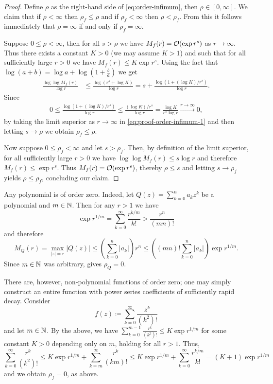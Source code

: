\begin{proof}
    Define $\rho$ as the right-hand side of \eqref{eq:order-infimum}, then $\rho \in [0, \infty]$. We claim that if $\rho < \infty$ then $\rho_f \leq \rho$ and if $\rho_f < \infty$ then $\rho < \rho_f$. From this it follows immediately that $\rho = \infty$ if and only if $\rho_f = \infty$.

    Suppose $0 \leq \rho < \infty$, then for all $s > \rho$ we have $M_f(r) = \mathcal{O}(\exp r^s)$ as $r \to \infty$. Thus there exists a constant $K > 0$ (we may assume $K > 1$) and such that for all sufficiently large $r > 0$ we have $M_f(r) \leq K \exp r^s$. Using the fact that $\log (a+b) = \log a + \log (1 + \frac{b}{a})$ we get
    \begin{align*}
        \frac{\log \log M_f(r)}{\log r} &\leq \frac{\log (r^s + \log K)}{\log r} = s + \frac{\log (1 + (\log K) / r^s)}{\log r}. \tag{\textasteriskcentered} \label{eq:proof-order-infimum-1}
    \end{align*}
    Since
    \begin{align*}
        0 \leq \frac{\log (1 + (\log K) / r^s)}{\log r} \leq \frac{(\log K) / r^s}{\log r} = \frac{\log K}{r^s \log r} \xrightarrow{r \to \infty} 0,
    \end{align*}
    by taking the limit superior as $r \to \infty$ in \eqref{eq:proof-order-infimum-1} and then letting $s \to \rho$ we obtain $\rho_f \leq \rho$.

    Now suppose $0 \leq \rho_f < \infty$ and let $s > \rho_f$. Then, by definition of the limit superior, for all sufficiently large $r > 0$ we have $ \log \log M_f(r) \leq s \log r$ and therefore $M_f(r) \leq \exp r^s$. Thus $M_f(r) = \mathcal{O}(\exp r^s)$, thereby $\rho \leq s$ and letting $s \to \rho_f$ yields $\rho \leq \rho_f$, concluding our claim.
\end{proof}

\begin{remark} \label{rem:order-zero}
    Any polynomial is of order zero. Indeed, let $Q(z) = \sum_{k=0}^n a_k z^k$ be a polynomial and $m \in \mathbb{N}$. Then for any $r > 1$ we have
    $$ \exp r^{1/m} = \sum_{k=0}^\infty \frac{r^{k/m}}{k!} > \frac{r^{n}}{(mn)!} $$
    and therefore
    $$ M_Q(r) = \max_{\vert z \vert = r} \vert Q(z) \vert \leq \left( \sum_{k=0}^n \vert a_k \vert \right) r^n \leq \left( (mn)! \sum_{k=0}^n \vert a_k \vert \right) \exp r^{1/m}. $$
    Since $m \in \mathbb{N}$ was arbitrary,  gives $\rho_Q = 0$.

    There are, however, non-polynomial functions of order zero; one may simply construct an entire function with power series coefficients of sufficiently rapid decay. Consider
    $$ f(z) \coloneqq \sum_{k=0}^\infty \frac{z^k}{(k^2)!} $$
    and let $m \in \mathbb{N}$. By the above, we have $\sum_{k=0}^{m-1} \frac{r^k}{(k^2)!} \leq K \exp r^{1/m}$ for some constant $K > 0$ depending only on $m$, holding for all $r > 1$. Thus,
    $$ \sum_{k=0}^\infty \frac{r^k}{(k^2)!} \leq K \exp r^{1/m} + \sum_{k=m}^\infty \frac{r^k}{(km)!} \leq K \exp r^{1/m} + \sum_{k=0}^\infty \frac{r^{k/m}}{k!} = (K + 1) \exp r^{1/m} $$
    and we obtain $\rho_f = 0$, as above.
\end{remark}

